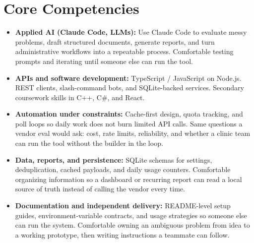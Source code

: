\documentclass[11pt,a4paper,sans]{moderncv}
\begin{document}
\section{Core Competencies}
\vspace{1pt}
\begin{itemize}

\item \textbf{Applied AI (Claude Code, LLMs):} Use Claude Code to evaluate messy problems, draft structured documents, generate reports, and turn administrative workflows into a repeatable process. Comfortable testing prompts and iterating until someone else can run the tool.

\item \textbf{APIs and software development:} TypeScript / JavaScript on Node.js. REST clients, slash-command bots, and SQLite-backed services. Secondary coursework skills in C++, C\#, and React.

\item \textbf{Automation under constraints:} Cache-first design, quota tracking, and poll loops so daily work does not burn limited API calls. Same questions a vendor eval would ask: cost, rate limits, reliability, and whether a clinic team can run the tool without the builder in the loop.

\item \textbf{Data, reports, and persistence:} SQLite schemas for settings, deduplication, cached payloads, and daily usage counters. Comfortable organizing information so a dashboard or recurring report can read a local source of truth instead of calling the vendor every time.

\item \textbf{Documentation and independent delivery:} README-level setup guides, environment-variable contracts, and usage strategies so someone else can run the system. Comfortable owning an ambiguous problem from idea to a working prototype, then writing instructions a teammate can follow.

\end{itemize}

\end{document}
